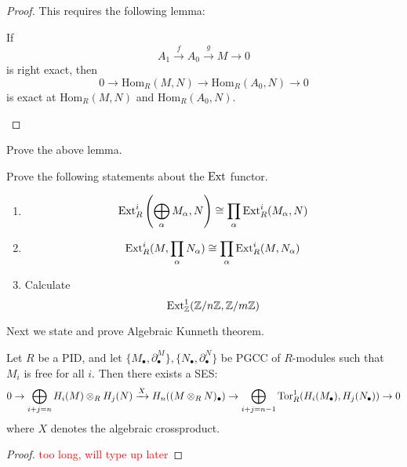 \begin{proof}
    This requires the following lemma:
    \begin{lem}
        If 
        \begin{equation*}
            A_1\xrightarrow{f}A_0\xrightarrow{g}M\to 0
        \end{equation*}
        is right exact, then 
        \begin{equation*}
            0\to\text{Hom}_R(M,N)\to \text{Hom}_R(A_0,N)\to 0
        \end{equation*}
        is exact at $\text{Hom}_R(M,N)$ and $\text{Hom}_R(A_0,N)$.
    \end{lem}
\end{proof}
\begin{prob}[HW(2.5)]
    Prove the above lemma.
\end{prob}
\begin{prob}[HW(2.6)]
    Prove the following statements about the $\text{Ext}$ functor.
    \begin{enumerate}
        \item \begin{equation*}
            \text{Ext}_R^i\left(\bigoplus_{\alpha}M_\alpha,N\right)\cong\prod_{\alpha}\text{Ext}_R^i(M_\alpha,N)
        \end{equation*}
        \item \begin{equation*}
            \text{Ext}_R^i(M,\prod_{\alpha}N_\alpha)\cong\prod_\alpha\text{Ext}_R^i(M,N_\alpha)
        \end{equation*}
        \item Calculate \begin{equation*}
            \text{Ext}_{\mathbb{Z}}^1(\mathbb{Z}/n\mathbb{Z},\mathbb{Z}/m\mathbb{Z})
        \end{equation*}
    \end{enumerate}
\end{prob}
Next we state and prove Algebraic Kunneth theorem.
\begin{thm}[AKT]
    Let $R$ be a PID, and let $\{M_\bullet,\partial_\bullet^M\}, \{N_\bullet, \partial_\bullet^N\}$ be PGCC of $R$-modules such that $M_i$ is free for all $i$. Then there exists a SES:
    \begin{equation*}
        0\to\bigoplus_{i+j=n}H_i(M)\otimes_R H_j(N)\xrightarrow{X} H_n((M\otimes_RN)_\bullet)\to\bigoplus_{i+j=n-1}\text{Tor}_R^1(H_i(M_\bullet), H_j(N_\bullet))\to 0
    \end{equation*}
    where $X$ denotes the algebraic crossproduct.
\end{thm}
\begin{proof}
    \textcolor{red}{too long, will type up later} 
\end{proof}


